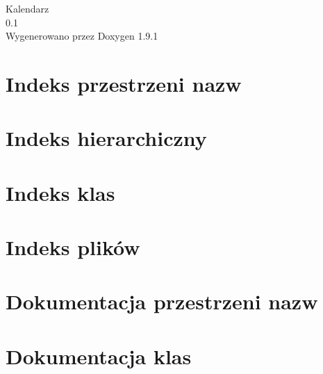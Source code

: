 \let\mypdfximage\pdfximage\def\pdfximage{\immediate\mypdfximage}\documentclass[twoside]{book}
\newcommand{\+}{\discretionary{\mbox{\scriptsize$\hookleftarrow$}}{}{}}
\newcommand{\clearemptydoublepage}{%
  \newpage{\pagestyle{empty}\cleardoublepage}%
}
\begin{document}
\raggedbottom

\hypersetup{pageanchor=false,
             bookmarksnumbered=true,
             pdfencoding=unicode
            }
\begin{titlepage}
\vspace*{7cm}
\begin{center}%
{\Large Kalendarz \\[1ex]\large 0.\+1 }\\
\vspace*{1cm}
{\large Wygenerowano przez Doxygen 1.9.1}\\
\end{center}
\end{titlepage}
\clearemptydoublepage
{}
\tableofcontents
\clearemptydoublepage
{}
\hypersetup{pageanchor=true}

\chapter{Indeks przestrzeni nazw}

\chapter{Indeks hierarchiczny}

\chapter{Indeks klas}

\chapter{Indeks plików}

\chapter{Dokumentacja przestrzeni nazw}


\chapter{Dokumentacja klas}















\end{document}
